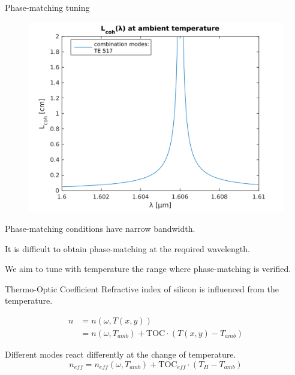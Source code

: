 \documentclass[11pt, leqno]{beamer}
\begin{document}
\begin{frame}{Phase-matching tuning}
	\begin{figure}
		\vspace{-10pt}
		\centering
	    \includegraphics[width=.55\textwidth]{narrow_bandwidth.png}
	\end{figure}
	Phase-matching conditions have narrow bandwidth.
	
	\vspace{20pt}
	It is difficult to obtain phase-matching at the required wavelength.
	
	\vspace{20pt}
	We aim to tune with temperature the range where phase-matching is verified.
\end{frame}
\begin{frame}{Thermo-Optic Coefficient}
	Refractive index of silicon is influenced from the temperature.
	
	\begin{equation}
	\begin{split}
		n 	&= n(\omega,T(x,y)) \\
			&= n(\omega,T_{amb}) + \mathrm{TOC}\cdot(T(x,y)-T_{amb})
		\label{eq_refractive_index}
	\end{split}
	\end{equation}
	
	\vspace{10pt}
	Different modes react differently at the change of temperature.
	\begin{equation}
		n_{eff} = n_{eff}(\omega,T_{amb}) + \mathrm{TOC}_{eff}\cdot(T_H-T_{amb})
		\label{eq_effective_index}
	\end{equation}
\end{frame}
\end{document}

